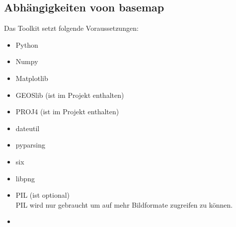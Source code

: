 \subsection[Dependencies]{Abhängigkeiten voon basemap}
Das Toolkit setzt folgende Voraussetzungen:
\newline
\begin{itemize}
 \item Python
 \item Numpy
 \item Matplotlib
 \item GEOSlib (ist im Projekt enthalten)
 \item PROJ4 (ist im Projekt enthalten)
 \item dateutil
 \item pyparsing
 \item six
 \item libpng
 \\
 \item PIL (ist optional)\\
 PIL wird nur gebraucht um auf mehr Bildformate zugreifen zu können.
 \item 
\end{itemize}
